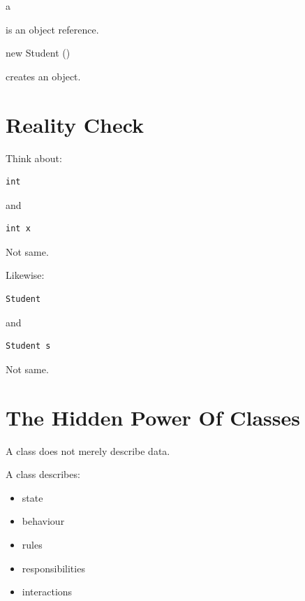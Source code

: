 \documentclass[11pt,a4paper]{book}
\begin{document}
\begin{center}

a

\end{center}

is an object reference.

\vspace{1em}

\begin{center}

new Student ()

\end{center}

creates an object.


\section{Reality Check}

Think about:

\begin{verbatim}
int
\end{verbatim}

and

\begin{verbatim}
int x
\end{verbatim}

Not same.

Likewise:

\begin{verbatim}
Student
\end{verbatim}

and

\begin{verbatim}
Student s
\end{verbatim}

Not same.


\section{The Hidden Power Of Classes}

A class does not merely describe data.

A class describes:

\begin{itemize}

\item state

\item behaviour

\item rules

\item responsibilities

\item interactions

\end{itemize}
\end{document}
